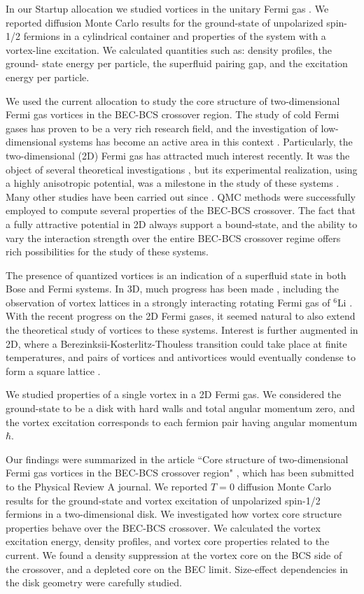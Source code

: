 \documentclass[12pt,letterpaper]{article}
\begin{document}
In our Startup allocation we studied
vortices in the unitary Fermi gas \cite{mad16}. We reported diffusion Monte 
Carlo results for the ground-state of unpolarized spin-1/2 fermions in a 
cylindrical container and properties of the system with a vortex-line 
excitation. We calculated quantities such as: density profiles, the ground-
state energy per particle, the superfluid pairing gap, and the excitation 
energy per particle.

We used the current allocation to study the core structure of two-dimensional 
Fermi gas vortices in the BEC-BCS crossover region.
The study of cold Fermi gases has proven to be a very rich research 
field, and the investigation of low-dimensional systems has become an 
active area in this context \cite{gio08,blo08}. Particularly,
the two-dimensional (2D) Fermi gas has attracted much interest 
recently. It was 
the object of several theoretical investigations 
\cite{ran89,ran90,pet03,mar05,tem07,zha08}, but its experimental 
realization, using a highly anisotropic potential, was a milestone in 
the study of these systems \cite{kir10}. Many other studies have been 
carried out since \cite{ore11,mak14}. QMC methods 
were successfully employed to compute several properties of the BEC-BCS 
crossover.
The fact that a fully attractive potential in 
2D always support a bound-state, and the ability to vary the 
interaction strength over the entire BEC-BCS crossover regime offers 
rich 
possibilities for the study of these systems.
	
The presence of quantized vortices is an indication of a superfluid 
state in both Bose and Fermi systems. In 3D, much progress has been 
made \cite{bul03,sen06,mad16}, including the observation of vortex 
lattices in a strongly interacting rotating Fermi gas of $^6$Li 
\cite{zwi05}. With the recent progress on the 2D Fermi gases, it seemed 
natural to also extend the theoretical study of vortices to these 
systems. Interest 
is further augmented in 2D, where a Berezinksii-Kosterlitz-Thouless 
transition \cite{ber70,kos72} could take place at finite temperatures, 
and pairs of vortices and antivortices would eventually condense to form 
a 
square lattice \cite{bot06}.

We studied properties of a single vortex in a 2D Fermi gas. We 
considered the ground-state to be a disk with hard walls and total 
angular momentum zero, and the vortex excitation corresponds to each 
fermion pair having angular momentum $\hbar$. 

Our findings were summarized in the article
``Core structure of two-dimensional Fermi gas vortices
in the BEC-BCS crossover region" \cite{mad17}, which has been submitted to the 
Physical 
Review A journal.
We reported $T=0$ diffusion Monte Carlo results for 
the ground-state and vortex excitation of unpolarized spin-1/2 fermions 
in a two-dimensional disk. We investigated how vortex core structure 
properties behave over the BEC-BCS crossover. We calculated the vortex 
excitation energy, density profiles, and vortex core properties related 
to the current. We found a density suppression at the vortex core on 
the BCS side of the crossover, and a depleted core on the BEC limit. 
Size-effect dependencies in the disk geometry were carefully studied.
\end{document}
